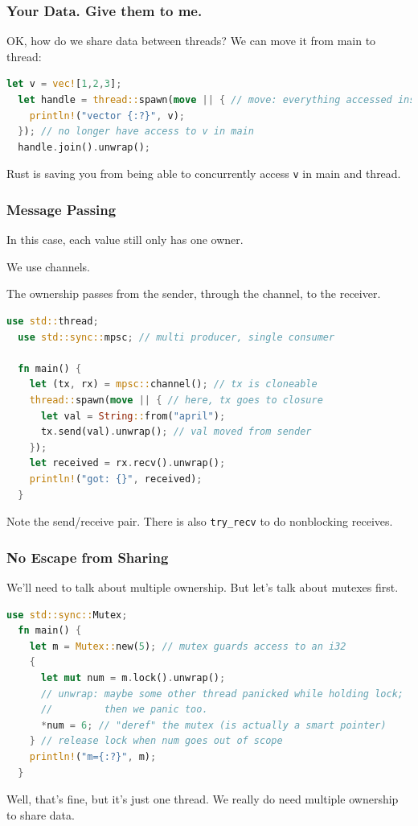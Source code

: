 \begin{frame}[fragile]
\frametitle{Your Data. Give them to me.}

OK, how do we share data between threads? We can move it from main to thread:
\begin{lstlisting}[language=Rust]
  let v = vec![1,2,3];
  let handle = thread::spawn(move || { // move: everything accessed inside closure is moved
    println!("vector {:?}", v);
  }); // no longer have access to v in main
  handle.join().unwrap();
\end{lstlisting}
Rust is saving you from being able to concurrently access {\tt v} in main and thread.


\end{frame}


\begin{frame}[fragile]
\frametitle{Message Passing}

In this case, each value still only has one owner. 

We use \alert{channels}. 

The ownership passes
from the sender, through the channel, to the receiver.
\begin{lstlisting}[language=Rust]
  use std::thread;
  use std::sync::mpsc; // multi producer, single consumer

  fn main() {
    let (tx, rx) = mpsc::channel(); // tx is cloneable
    thread::spawn(move || { // here, tx goes to closure
      let val = String::from("april");
      tx.send(val).unwrap(); // val moved from sender
    });
    let received = rx.recv().unwrap();
    println!("got: {}", received);
  }
\end{lstlisting}
Note the send/receive pair. There is also {\tt try\_recv} to do nonblocking receives.


\end{frame}


\begin{frame}[fragile]
\frametitle{No Escape from Sharing}

We'll need to talk about multiple ownership. But let's talk about mutexes first.
\begin{lstlisting}[language=Rust]
  use std::sync::Mutex;
  fn main() {
    let m = Mutex::new(5); // mutex guards access to an i32
    {
      let mut num = m.lock().unwrap();
      // unwrap: maybe some other thread panicked while holding lock;
      //         then we panic too.
      *num = 6; // "deref" the mutex (is actually a smart pointer)
    } // release lock when num goes out of scope
    println!("m={:?}", m);
  }
\end{lstlisting}
Well, that's fine, but it's just one thread. We really do need multiple ownership
to share data.

\end{frame}


